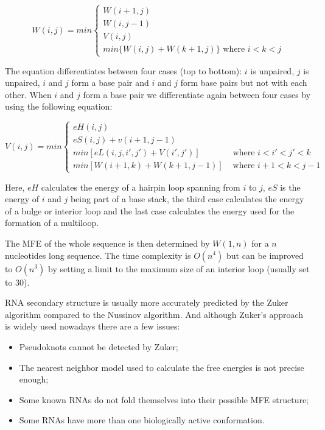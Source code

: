\begin{equation*}
W(i,j) = min
  \begin{cases}
	W(i+1,j) \\
	W(i,j-1) \\
	V(i,j) \\
	min\{W(i,j)+W(k+1,j)\} \text{ where $i<k<j$}
  \end{cases}
\end{equation*}

The equation differentiates between four cases (top to bottom): $i$ is unpaired, $j$ is unpaired, $i$ and $j$ form a base pair and $i$ and $j$ form base pairs but not with each other. When $i$ and $j$ form a base pair we differentiate again between four cases by using the following equation:

\begin{equation*}
V(i,j) = min
  \begin{cases}
	eH(i,j) \\
	eS(i,j) + v(i+1,j-1) \\
	min[eL(i,j,i',j') + V(i',j')] & \text{ where $i<i'<j'<k$} \\
	min[W(i+1,k)+W(k+1,j-1)] & \text{ where $i+1<k<j-1$}
  \end{cases}
\end{equation*}

Here, $eH$ calculates the energy of a hairpin loop spanning from $i$ to $j$, $eS$ is the energy of $i$ and $j$ being part of a base stack, the third case calculates the energy of a bulge or interior loop and the last case calculates the energy used for the formation of a multiloop.

The MFE of the whole sequence is then determined by $W(1,n)$ for a $n$ nucleotides long sequence. The time complexity is $O(n^4)$ but can be improved to $O(n^3)$ by setting a limit to the maximum size of an interior loop (usually set to 30).   

RNA secondary structure is usually more accurately predicted by the Zuker algorithm compared to the Nussinov algorithm. And although Zuker's approach is widely used nowadays there are a few issues:
\begin{itemize}
	\item Pseudoknots cannot be detected by Zuker;
	\item The nearest neighbor model used to calculate the free energies is not precise enough;
	\item Some known RNAs do not fold themselves into their possible MFE structure;
	\item Some RNAs have more than one biologically active conformation.
\end{itemize}

